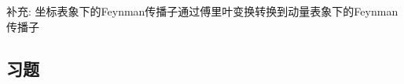 补充:
坐标表象下的Feynman传播子通过傅里叶变换转换到动量表象下的Feynman传播子


\subsection{}





















\subsection{习题}


